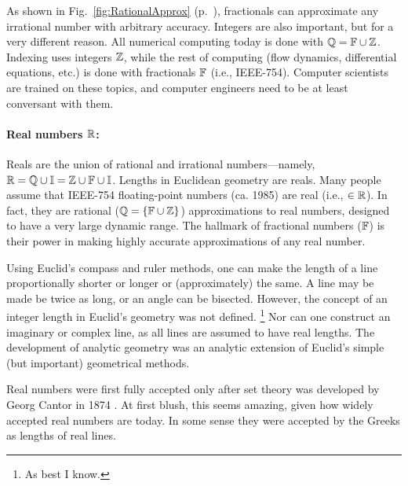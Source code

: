 \documentclass{ximera}
\begin{document}
As shown in Fig.~\ref{fig:RationalApprox} (p.~\pageref{fig:RationalApprox}), fractionals can
approximate any irrational number with arbitrary accuracy. 
Integers are also important, but for a very different reason.  All
numerical computing today is done with $\mathbb{Q} = \mathbb{F}\cup\mathbb{Z}$.  Indexing uses integers $\mathbb{Z}$, while the rest of
computing (flow dynamics, differential equations, etc.) is done with fractionals $\mathbb{F}$ (i.e., IEEE-754).
Computer scientists are trained on these topics, and computer engineers need to be at least conversant
with them.


\paragraph{Real numbers $\mathbb{R}$: \label{page:bbR} }
Reals are the union of rational and irrational numbers---namely, $\mathbb{R} = \mathbb{Q} \cup \mathbb{I}  = \mathbb{Z} \cup \mathbb{F} \cup \mathbb{I}$.
Lengths in Euclidean geometry are reals.  Many people assume that IEEE-754 floating-point numbers
(ca. 1985) are real (i.e., $\in\mathbb{R}$). In fact, they are rational ($\mathbb{Q} = \{\mathbb{F} \cup \mathbb{Z} \}$) approximations to
real numbers, designed to have a very large dynamic range.
The hallmark of fractional numbers ($\mathbb{F}$) is their power in making highly accurate approximations
of any real number.

Using Euclid's compass and ruler methods, one can make the length of a line proportionally shorter or longer or
(approximately) the same.  A line may be made be twice as long, or an angle can be bisected. However,
the concept of an integer length in Euclid's geometry was not defined.%
 \footnote{As best I know.}
Nor can one construct an imaginary or complex line, as all lines are assumed to have real lengths.
The development of analytic geometry was an analytic extension of Euclid's simple (but important)
geometrical methods.

  
Real numbers were first fully accepted only after set theory was developed by Georg Cantor in 1874
\citep[p.~461]{JS10}. At first blush, this seems amazing, given how widely accepted real numbers are
today.  In some sense they were accepted by the Greeks as lengths of real lines.
\end{document}
